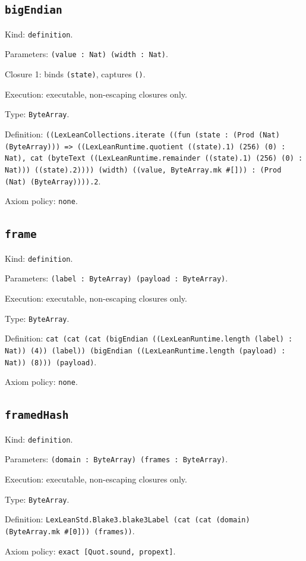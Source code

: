 \documentclass[11pt]{article}
\begin{document}
\subsection*{\texttt{bigEndian}}
\noindent Kind: \texttt{definition}.\par
\noindent Parameters: \texttt{(value : Nat) (width : Nat)}.\par
\noindent Closure 1: binds \texttt{(state)}, captures \texttt{()}.\par
\noindent Execution: executable, non-escaping closures only.\par
\noindent Type: \texttt{ByteArray}.\par
\noindent Definition: \texttt{((LexLeanCollections.iterate ((fun (state : (Prod (Nat) (ByteArray))) => ((LexLeanRuntime.quotient ((state).1) (256) (0) : Nat), cat (byteText ((LexLeanRuntime.remainder ((state).1) (256) (0) : Nat))) ((state).2)))) (width) ((value, ByteArray.mk \#[])) : (Prod (Nat) (ByteArray)))).2}.\par
\noindent Axiom policy: \texttt{none}.\par
\subsection*{\texttt{frame}}
\noindent Kind: \texttt{definition}.\par
\noindent Parameters: \texttt{(label : ByteArray) (payload : ByteArray)}.\par
\noindent Execution: executable, non-escaping closures only.\par
\noindent Type: \texttt{ByteArray}.\par
\noindent Definition: \texttt{cat (cat (cat (bigEndian ((LexLeanRuntime.length (label) : Nat)) (4)) (label)) (bigEndian ((LexLeanRuntime.length (payload) : Nat)) (8))) (payload)}.\par
\noindent Axiom policy: \texttt{none}.\par
\subsection*{\texttt{framedHash}}
\noindent Kind: \texttt{definition}.\par
\noindent Parameters: \texttt{(domain : ByteArray) (frames : ByteArray)}.\par
\noindent Execution: executable, non-escaping closures only.\par
\noindent Type: \texttt{ByteArray}.\par
\noindent Definition: \texttt{LexLeanStd.Blake3.blake3Label (cat (cat (domain) (ByteArray.mk \#[0])) (frames))}.\par
\noindent Axiom policy: \texttt{exact [Quot.sound, propext]}.\par
\end{document}
